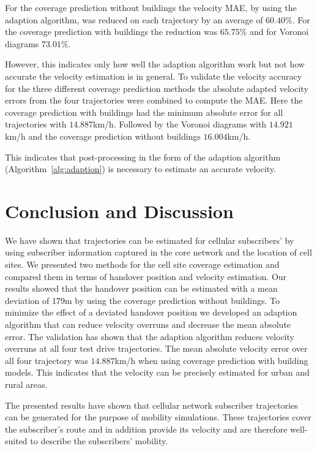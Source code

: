 \documentclass[twocolumn]{bmcart}%
\begin{document}
For the coverage prediction without buildings the velocity MAE, by using the adaption algorithm, was reduced on each trajectory by an average of $60.40\%$. For the coverage prediction with buildings the reduction was $65.75\%$ and for Voronoi diagrams $73.01\%$. 

However, this indicates only how well the adaption algorithm work but not how accurate the velocity estimation is in general. To validate the velocity accuracy for the three different coverage prediction methods the absolute adapted velocity errors from the four trajectories were combined to compute the MAE. Here the coverage prediction with buildings had the minimum absolute error for all trajectories with $14.887$km/h. Followed by the Voronoi diagrams with $14.921$km/h and the coverage prediction without buildings $16.004$km/h. 

This indicates that post-processing in the form of the adaption algorithm (Algorithm~\ref{alg:adaption}) is necessary to estimate an accurate velocity. 

\section*{Conclusion and Discussion}
We have shown that trajectories can be estimated for cellular subscribers' by using subscriber information captured in the core network and the location of cell sites. We presented two methods for the cell site coverage estimation and compared them in terms of handover position and velocity estimation. Our results showed that the handover position can be estimated with a mean deviation of 179m by using the coverage prediction without buildings. To minimize the effect of a deviated handover position we developed an adaption algorithm that can reduce velocity overruns and decrease the mean absolute error. The validation has shown that the adaption algorithm reduces velocity overruns at all four test drive trajectories. The mean absolute velocity error over all four trajectory was $14.887$km/h when using coverage prediction with building models. This indicates that the velocity can be precisely estimated for urban and rural areas.

The presented results have shown that cellular network subscriber trajectories can be generated for the purpose of mobility simulations. These trajectories cover the subscriber's route and in addition provide its velocity and are therefore well-suited to describe the subscribers' mobility. %
\end{document}
